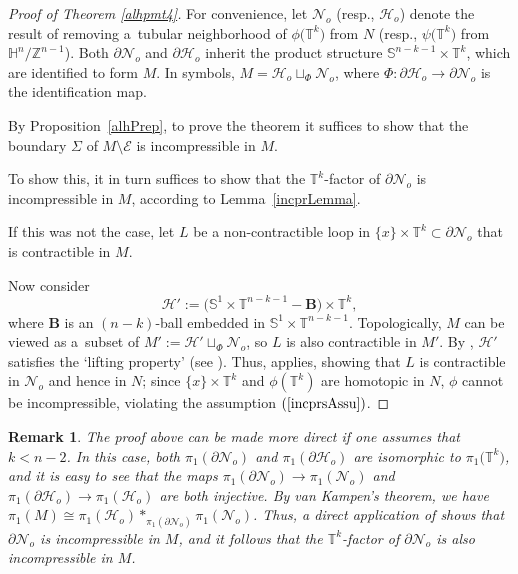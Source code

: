\documentclass[10pt,a4paper]{amsart}
\numberwithin{equation}{section}
\newtheorem{Remark}[Theorem]{Remark} }
\def\S{\mathbb{S}}
\def\H{\mathbb{H}}
\def\T{\mathbb{T}}
\def\Z{\mathbb{Z}}
\def\Bb{\mathbf{B}}
\def\Hcal{\mathcal{H}}
\def\Ecal{\mathcal{E}}
\def\Ncal{\mathcal{N}}
\begin{document}
\begin{proof}[Proof of  Theorem \ref{alhpmt4}]	
	For convenience, let $\Ncal_o$ (resp., $\Hcal_o$) denote the
	result of removing a~tubular neighborhood of $\phi\big(\T^k\big)$ from $N$ (resp., $\psi\big(\T^k\big)$ from $\H^n/\Z^{n-1}$). Both
	$\partial \Ncal_o$ and $\partial \Hcal_o$ inherit the product structure $\S^{n-k-1}\times \T^{k}$, which are
	identified to form $M$. In symbols, $M = \Hcal_o\sqcup_\Phi \Ncal_o$, where $\Phi\colon  \partial \Hcal_o\rightarrow \partial \Ncal_o$
	is the identification map.
		
	By Proposition~\ref{alhPrep}, to prove the theorem it suffices to show that the boundary
	$\Sigma$ of $M\setminus\Ecal$ is incompressible in $M$.
	
	To show this, it in turn suffices to show that the $\T^k$-factor of $\partial \Ncal_o$
	is incompressible in $M$, according to Lemma~\ref{incprLemma}.
	
	If this was not the case, let $L$ be a non-contractible loop in
	$\{x\}\times \T^{k}\subset \partial \Ncal_o$
	that is contractible in $M$.
	
	Now consider
	\[	
		\Hcal':=\bigl(\S^1\times \T^{n-k-1} - \Bb\bigr)\times \T^k,
	\]
	where $\Bb$ is an $(n-k)$-ball embedded in $\S^1\times \T^{n-k-1}$.
	Topologically, $M$ can be viewed as a~subset of $M':=\Hcal' \sqcup_\Phi \Ncal_o$, so $L$ is also contractible
	in $M'$. By \cite[Lemma~{A.3}]{CLSZ2021}, $\Hcal'$ satisfies the `lifting property' (see \cite[Definition~{A.2}]{CLSZ2021}).
	Thus, \cite[Lemma~{A.4}]{CLSZ2021} applies, showing that $L$ is contractible in $\Ncal_o$ and hence in $N$;
	since $\{x\}\times\T^{k}$ and $\phi(\T^k)$ are homotopic in $N$, $\phi$ cannot be incompressible, violating the assumption
	$(\ref{incprsAssu})$.
\end{proof}

\begin{Remark}\label{vanKampenRmk}
The proof above can be made more direct if one assumes that $k<n-2$. In this case, both $\pi_1(\partial \Ncal_o)$ and $\pi_1(\partial \Hcal_o)$ are isomorphic to $\pi_{1}\big( \T^{k}\big)$, and it is easy to see that the maps $\pi_1\left(\partial \mathcal{N}_o\right) \rightarrow \pi_1\left(\mathcal{N}_o\right)$ and $\pi_1\left(\partial \mathcal{H}_o\right) \rightarrow \pi_1\left(\mathcal{H}_o\right)$
are both injective.
By van Kampen's theorem, we have $\pi_1(M) \cong \pi_1\left(\mathcal{H}_o\right) *_{\pi_1\left(\partial \mathcal{N}_o\right)} \pi_1\left(\mathcal{N}_o\right)$. Thus, a direct
application of
\cite[Theorem~11.67\,$(i)$]{Rotman_group} shows that
$\partial\mathcal{N}_o$ is incompressible in $M$, and it follows that the $\T^k$-factor of $\partial\mathcal{N}_o$ is also incompressible in $M$.
\end{Remark}
\end{document}
